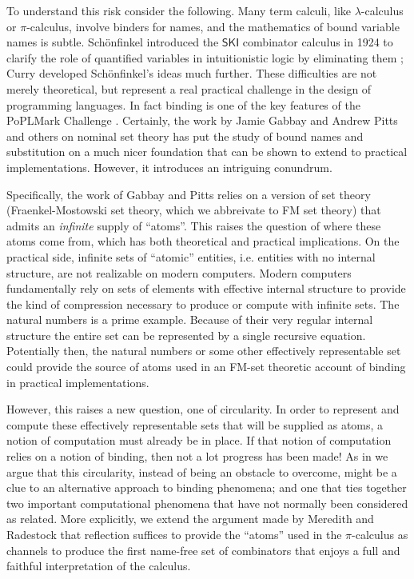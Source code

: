 \documentclass[submission,copyright,creativecommons]{eptcs}
\newcommand{\pic}{$\pi$-calculus}
\theoremstyle{definition}
\theoremstyle{remark}
\theoremstyle{remark}
\begin{document}
To understand this risk consider the following. Many term calculi,
like $\lambda$-calculus or {\pic}, involve binders for names, and the
mathematics of bound variable names is subtle. Sch\"onfinkel
introduced the $\mathsf{SKI}$ combinator calculus in 1924 to clarify
the role of quantified variables in intuitionistic logic by
eliminating them \cite{finkel}; Curry developed Sch\"onfinkel's ideas
much further. These difficulties are not merely theoretical, but
represent a real practical challenge in the design of programming
languages. In fact binding is one of the key features of the PoPLMark
Challenge \cite{PoPLMark}. Certainly, the work by Jamie Gabbay and
Andrew Pitts \cite{DBLP:journals/fac/GabbayP02} and others
\cite{DBLP:journals/jcss/Clouston14} on nominal set theory has put the
study of bound names and substitution on a much nicer foundation that
can be shown to extend to practical implementations. However, it
introduces an intriguing conundrum.

Specifically, the work of Gabbay and Pitts relies on a version of set
theory (Fraenkel-Mostowski set theory, which we abbreivate to FM set
theory) that admits an \emph{infinite} supply of ``atoms''. This raises the
question of where these atoms come from, which has both theoretical
and practical implications. On the practical side, infinite sets of
``atomic'' entities, i.e. entities with no internal structure, are not
realizable on modern computers. Modern computers fundamentally rely on
sets of elements with effective internal structure to provide the kind
of compression necessary to produce or compute with infinite sets. The
natural numbers is a prime example. Because of their very regular
internal structure the entire set can be represented by a single
recursive equation. Potentially then, the natural numbers or some
other effectively representable set could provide the source of atoms
used in an FM-set theoretic account of binding in practical
implementations. 

However, this raises a new question, one of circularity. In order to
represent and compute these effectively representable sets that will
be supplied as atoms, a notion of computation must already be in
place. If that notion of computation relies on a notion of binding,
then not a lot progress has been made! As in
\cite{DBLP:journals/entcs/MeredithR05} we argue that this circularity,
instead of being an obstacle to overcome, might be a clue to an
alternative approach to binding phenomena; and one that ties together
two important computational phenomena that have not normally been
considered as related. More explicitly, we extend the argument made by
Meredith and Radestock that reflection suffices to provide the
``atoms'' used in the {\pic} as channels to produce the first
name-free set of combinators that enjoys a full and faithful
interpretation of the calculus.
\end{document}
